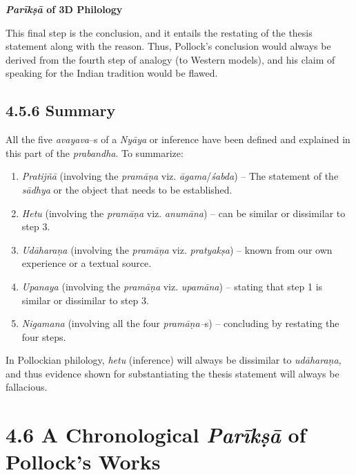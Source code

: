 \textbf{\textit{Parīkṣā} of 3D Philology}

This final step is the conclusion, and it entails the restating of the thesis statement along with the reason. Thus, Pollock’s conclusion would always be derived from the fourth step of analogy (to Western models), and his claim of speaking for the Indian tradition would be flawed.


\subsection*{4.5.6 Summary}

All the five \textit{avayava}–s of a \textit{Nyāya} or inference have been defined and explained in this part of the \textit{prabandha}. To summarize:

\vspace{-.3cm}

\begin{enumerate}
\itemsep=0pt
\item \textit{Pratijñā} (involving the \textit{pramāṇa }viz.\textit{ āgama}/\textit{śabda}) – The statement of the \textit{sādhya }or the object that needs to be established.

 \item \textit{Hetu} (involving the \textit{pramāṇa }viz.\textit{ anumāna}) – can be similar or dissimilar to step 3.

 \item \textit{Udāharaṇa} (involving the \textit{pramāṇa }viz.\textit{ pratyakṣa}) – known from our own experience or a textual source.

 \item \textit{Upanaya} (involving the \textit{pramāṇa }viz.\textit{ upamāna}) – stating that step 1 is similar or dissimilar to step 3.

 \item \textit{Nigamana} (involving all the four \textit{pramāṇa–}s) – concluding by restating the four steps.

\end{enumerate}

\vspace{-.3cm}

In Pollockian philology, \textit{hetu} (inference) will always be dissimilar to \textit{udāharaṇa,} and thus evidence shown for substantiating the thesis statement will always be fallacious.

\vspace{-.3cm}

\section*{4.6 A Chronological {\it {\bfseries Parīkṣā}} of Pollock’s Works}


